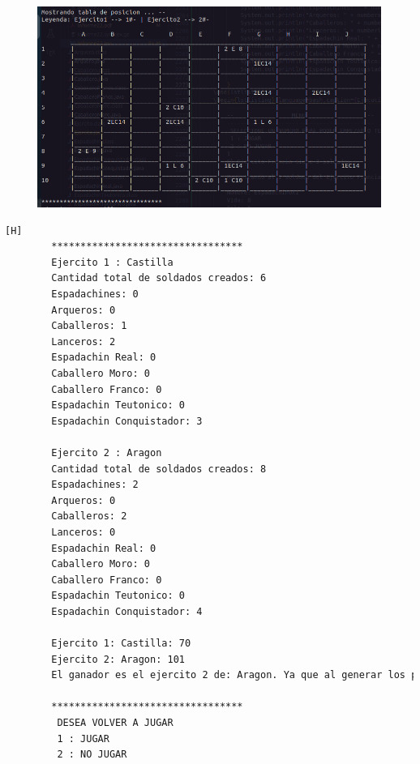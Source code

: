 \documentclass{article}
\begin{document}
	\begin{figure}[H]
		\centering
		\includegraphics[width=1.0\textwidth,keepaspectratio]{img/Commit10.png}
	\end{figure}
	\begin{lstlisting}[language=bash,caption={Ejecucion:}][H]
		*********************************
		Ejercito 1 : Castilla
		Cantidad total de soldados creados: 6
		Espadachines: 0
		Arqueros: 0
		Caballeros: 1
		Lanceros: 2
		Espadachin Real: 0
		Caballero Moro: 0
		Caballero Franco: 0
		Espadachin Teutonico: 0
		Espadachin Conquistador: 3
		
		Ejercito 2 : Aragon
		Cantidad total de soldados creados: 8
		Espadachines: 2
		Arqueros: 0
		Caballeros: 2
		Lanceros: 0
		Espadachin Real: 0
		Caballero Moro: 0
		Caballero Franco: 0
		Espadachin Teutonico: 0
		Espadachin Conquistador: 4
		
		Ejercito 1: Castilla: 70
		Ejercito 2: Aragon: 101
		El ganador es el ejercito 2 de: Aragon. Ya que al generar los porcentajes de probabilidad de victoria basada en los niveles de vida de sus soldados y aplicando un experimento aleatorio salio vencedor. (Aleatorio generado : 59.06)
		
		*********************************
		 DESEA VOLVER A JUGAR
		 1 : JUGAR
		 2 : NO JUGAR
		
	\end{lstlisting}
\end{document}
